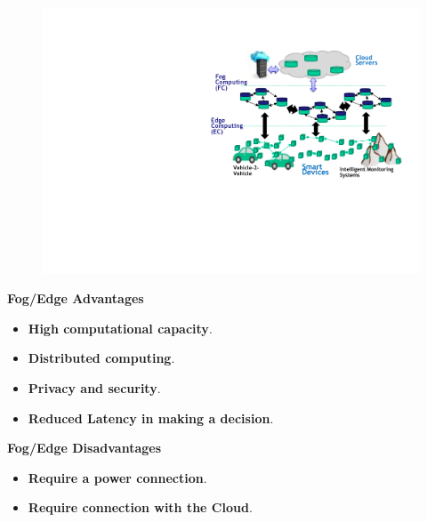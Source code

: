 \documentclass[a4paper]{article}
\begin{document}
    \begin{figure}[!htp]
        \centering
        \includegraphics[width=.8\textwidth]{img/edge-fog-computing-systems-1.pdf}
    \end{figure}

    \begin{flushleft}
        \textcolor{Green3}{ \textbf{Fog/Edge Advantages}}
    \end{flushleft}
    \begin{itemize}
        \item \textbf{High computational capacity}.
        \item \textbf{Distributed computing}.
        \item \textbf{Privacy and security}.
        \item \textbf{Reduced Latency in making a decision}.
    \end{itemize}

    \begin{flushleft}
        \textcolor{Red2}{ \textbf{Fog/Edge Disadvantages}}
    \end{flushleft}
    \begin{itemize}
        \item \textbf{Require a power connection}.
        \item \textbf{Require connection with the Cloud}.
    \end{itemize}

    \newpage
\end{document}
